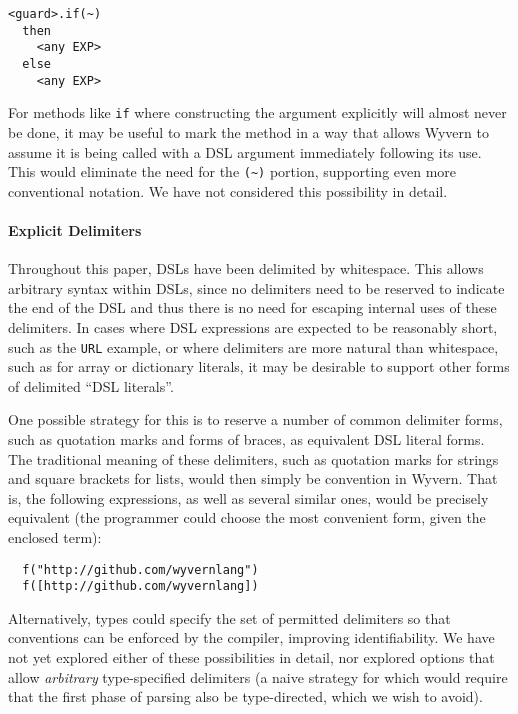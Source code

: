 \begin{lstlisting}
<guard>.if(~)
  then
    <any EXP>
  else
    <any EXP>
\end{lstlisting}

For methods like \verb|if| where constructing the argument explicitly will almost never be done, it may be useful to mark the method in a way that allows Wyvern to assume it is being called with a DSL argument immediately following its use. This would eliminate the need for the \verb|(~)| portion, supporting even more conventional notation. We have not considered this possibility in detail.

\paragraph{Explicit Delimiters}
Throughout this paper, DSLs have been delimited by whitespace. This allows arbitrary syntax within DSLs, since no delimiters need to be reserved to indicate the end of the DSL and thus there is no need for escaping internal uses of these delimiters. In cases where DSL expressions are expected to be reasonably short, such as the \lstinline{URL} example, or where delimiters are more natural than whitespace, such as for array or dictionary literals, it may be desirable to support other forms of delimited ``DSL literals''. 

One possible strategy for this is to reserve a number of common delimiter forms, such as quotation marks and  forms of braces, as equivalent DSL literal forms. The traditional meaning of these delimiters, such as quotation marks for strings and square brackets for lists, would then simply be convention in Wyvern. That is, the following expressions, as well as several similar ones, would be precisely equivalent (the programmer could choose the most convenient form, given the enclosed term):
\begin{verbatim}
  f("http://github.com/wyvernlang")  
  f([http://github.com/wyvernlang])
\end{verbatim}

Alternatively, types could specify the set of permitted delimiters so that conventions can be enforced by the compiler, improving identifiability. We have not yet explored either of these possibilities in detail, nor explored options that allow \emph{arbitrary} type-specified delimiters (a naive strategy for which would require that the first phase of parsing also be type-directed, which we wish to avoid).

